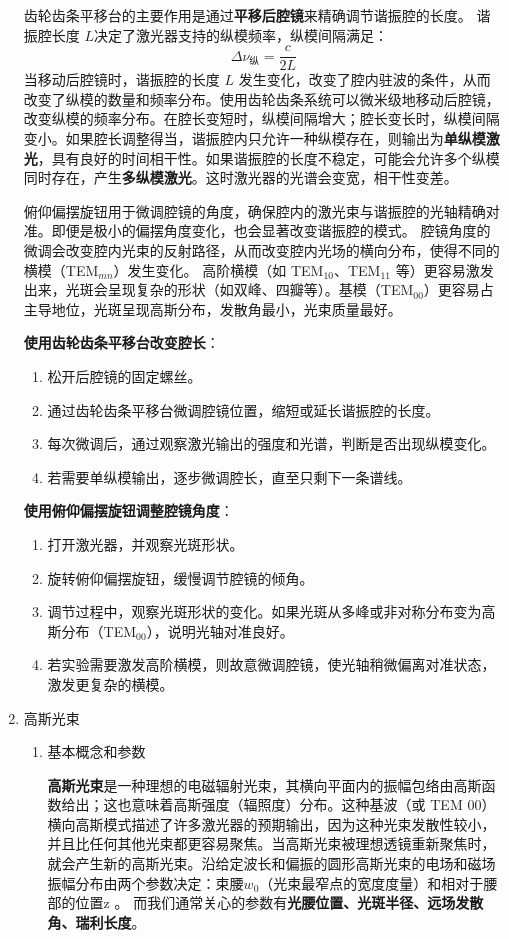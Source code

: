 \begin{enumerate}
	齿轮齿条平移台的主要作用是通过\textbf{平移后腔镜}来精确调节谐振腔的长度。  谐振腔长度 \(L\)决定了激光器支持的纵模频率，纵模间隔满足：
	\[
	\Delta \nu_{\text{纵}} = \frac{c}{2L}
	\]
	当移动后腔镜时，谐振腔的长度 \(L\) 发生变化，改变了腔内驻波的条件，从而改变了纵模的数量和频率分布。使用齿轮齿条系统可以微米级地移动后腔镜，改变纵模的频率分布。在腔长变短时，纵模间隔增大；腔长变长时，纵模间隔变小。如果腔长调整得当，谐振腔内只允许一种纵模存在，则输出为\textbf{单纵模激光}，具有良好的时间相干性。如果谐振腔的长度不稳定，可能会允许多个纵模同时存在，产生\textbf{多纵模激光}。这时激光器的光谱会变宽，相干性变差。
	
	 俯仰偏摆旋钮用于微调腔镜的角度，确保腔内的激光束与谐振腔的光轴精确对准。即便是极小的偏摆角度变化，也会显著改变谐振腔的模式。 腔镜角度的微调会改变腔内光束的反射路径，从而改变腔内光场的横向分布，使得不同的横模（TEM\(_{mn}\)）发生变化。  高阶横模（如 TEM\(_{10}\)、TEM\(_{11}\) 等）更容易激发出来，光斑会呈现复杂的形状（如双峰、四瓣等）。基模（TEM\(_{00}\)）更容易占主导地位，光斑呈现高斯分布，发散角最小，光束质量最好。
	 
	 \textbf{使用齿轮齿条平移台改变腔长}：
	 \begin{enumerate}
	 	\item 松开后腔镜的固定螺丝。
	 	\item 通过齿轮齿条平移台微调腔镜位置，缩短或延长谐振腔的长度。
	 	\item 每次微调后，通过观察激光输出的强度和光谱，判断是否出现纵模变化。
	 	\item 若需要单纵模输出，逐步微调腔长，直至只剩下一条谱线。
	 \end{enumerate}
	 
	 \textbf{使用俯仰偏摆旋钮调整腔镜角度}：
	 \begin{enumerate}
	 	\item 打开激光器，并观察光斑形状。
	 	\item 旋转俯仰偏摆旋钮，缓慢调节腔镜的倾角。
	 	\item 调节过程中，观察光斑形状的变化。如果光斑从多峰或非对称分布变为高斯分布（TEM\(_{00}\)），说明光轴对准良好。
	 	\item 若实验需要激发高阶横模，则故意微调腔镜，使光轴稍微偏离对准状态，激发更复杂的横模。
	 \end{enumerate}
	
	\item 高斯光束
	\begin{enumerate}
		\item 基本概念和参数
		
		\textbf{高斯光束}是一种理想的电磁辐射光束，其横向平面内的振幅包络由高斯函数给出；这也意味着高斯强度（辐照度）分布。这种基波（或 TEM 00）横向高斯模式描述了许多激光器的预期输出，因为这种光束发散性较小，并且比任何其他光束都更容易聚焦。当高斯光束被理想透镜重新聚焦时，就会产生新的高斯光束。沿给定波长和偏振的圆形高斯光束的电场和磁场振幅分布由两个参数决定：束腰$w_0$（光束最窄点的宽度度量）和相对于腰部的位置z 。 而我们通常关心的参数有\textbf{光腰位置、光斑半径、远场发散角、瑞利长度}。
		

\end{enumerate}
\end{enumerate}
